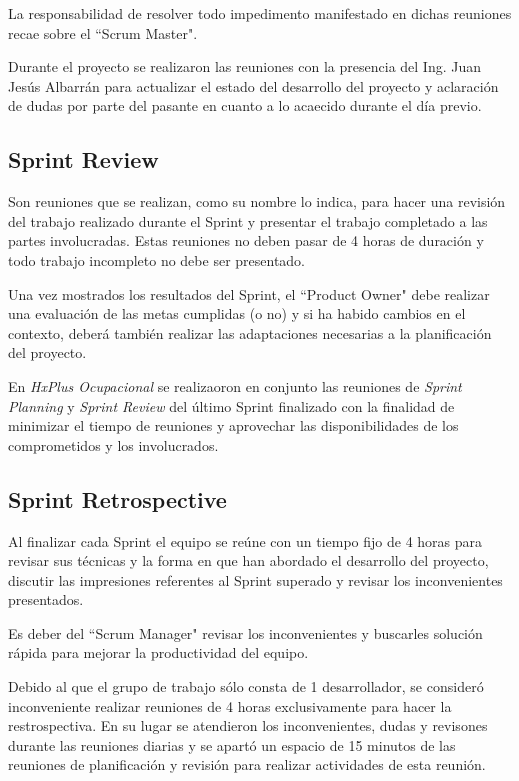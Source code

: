         La responsabilidad de resolver todo impedimento manifestado en dichas reuniones recae sobre el ``Scrum Master".
        
        Durante el proyecto se realizaron las reuniones con la presencia del Ing. Juan Jesús Albarrán para actualizar el estado del desarrollo del proyecto y aclaración de dudas por parte del pasante en cuanto a lo acaecido durante el día previo.
        
        \subsection{Sprint Review}
        
        Son reuniones que se realizan, como su nombre lo indica, para hacer una revisión del trabajo realizado durante el Sprint y presentar el trabajo completado a las partes involucradas. Estas reuniones no deben pasar de 4 horas de duración y todo trabajo incompleto no debe ser presentado.
        
        Una vez mostrados los resultados del Sprint, el ``Product Owner" debe realizar una evaluación de las metas cumplidas (o no) y si ha habido cambios en el contexto, deberá también realizar las adaptaciones necesarias a la planificación del proyecto.
        
        En \textit{HxPlus Ocupacional} se realizaoron en conjunto las reuniones de \textit{Sprint Planning} y \textit{Sprint Review} del último Sprint finalizado con la finalidad de minimizar el tiempo de reuniones y aprovechar las disponibilidades de los comprometidos y los involucrados.
        
        \subsection{Sprint Retrospective}
        
        Al finalizar cada Sprint el equipo se reúne con un tiempo fijo de 4 horas para revisar sus técnicas y la forma en que han abordado el desarrollo del proyecto, discutir las impresiones referentes al Sprint superado y revisar los inconvenientes presentados.
        
        Es deber del ``Scrum Manager" revisar los inconvenientes y buscarles solución rápida para mejorar la productividad del equipo.
        
        Debido al que el grupo de trabajo sólo consta de 1 desarrollador, se consideró inconveniente realizar reuniones de 4 horas exclusivamente para hacer la restrospectiva. En su lugar se atendieron los inconvenientes, dudas y revisones durante las reuniones diarias y se apartó un espacio de 15 minutos de las reuniones de planificación y revisión para realizar actividades de esta reunión.
        
